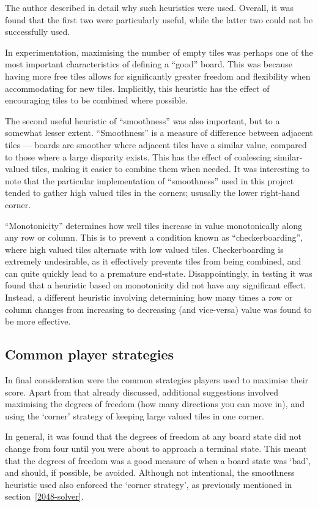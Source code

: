 \documentclass[a4paper, 11pt, titlepage]{report}
\begin{document}
The author described in detail why such heuristics were used\cite{2048explanation}. Overall, it was found that the first two were particularly useful, while the latter two could not be successfully used. 

In experimentation, maximising the number of empty tiles was perhaps one of the most important characteristics of defining a ``good'' board. This was because having more free tiles allows for significantly greater freedom and flexibility when accommodating for new tiles. Implicitly, this heuristic has the effect of encouraging tiles to be combined where possible.

The second useful heuristic of ``smoothness'' was also important, but to a somewhat lesser extent. ``Smoothness'' is a measure of difference between adjacent tiles ---  boards are smoother where adjacent tiles have a similar value, compared to those where a large disparity exists. This has the effect of coalescing similar-valued tiles, making it easier to combine them when needed. It was interesting to note that the particular implementation of ``smoothness'' used in this project tended to gather high valued tiles in the corners; ususally the lower right-hand corner.

``Monotonicity'' determines how well tiles increase in value monotonically along any row or column. This is to prevent a condition known as ``checkerboarding'', where high valued tiles alternate with low valued tiles. Checkerboarding is extremely undesirable, as it effectively prevents tiles from being combined, and can quite quickly lead to a premature end-state. Disappointingly, in testing it was found that a heuristic based on monotonicity did not have any significant effect. Instead, a different heuristic involving determining how many times a row or column changes from increasing to decreasing (and vice-versa) value was found to be more effective.

\subsection{Common player strategies}
In final consideration were the common strategies\cite{threes-strategies} players used to maximise their score. Apart from that already discussed, additional suggestions involved maximising the degrees of freedom (how many directions you can move in), and using the `corner' strategy of keeping large valued tiles in one corner. 

In general, it was found that the degrees of freedom at any board state did not change from four until you were about to approach a terminal state. This meant that the degrees of freedom was a good measure of when a board state was `bad', and should, if possible, be avoided. Although not intentional, the smoothness heuristic used also enforced the `corner strategy', as previously mentioned in section~\ref{2048-solver}.
\end{document}
